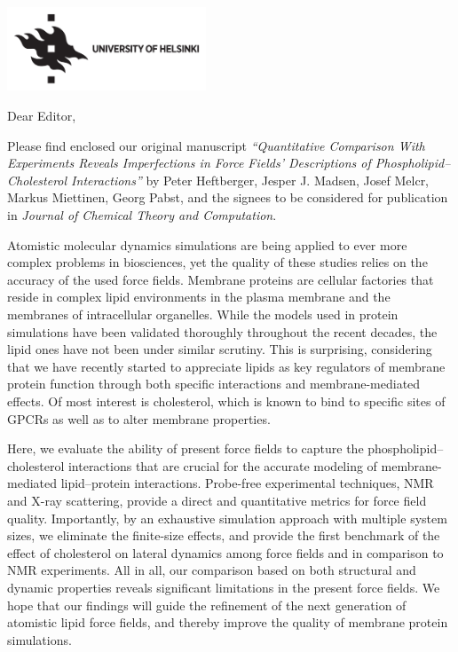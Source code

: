 \documentclass[10pt]{article}
\begin{document}
\begin{flushright}
\includegraphics[height=2.5cm]{CoverLetter/logo_uh.pdf}
\end{flushright}

\bigskip
\bigskip
\bigskip
Dear Editor,
\bigskip

Please find enclosed our original manuscript \emph{``Quantitative Comparison With Experiments Reveals Imperfections in Force Fields' Descriptions of Phospholipid--Cholesterol Interactions''} by Peter Heftberger, Jesper J. Madsen, Josef Melcr, Markus Miettinen, Georg Pabst, and the signees to be considered for publication in \emph{Journal of Chemical Theory and Computation}.

Atomistic molecular dynamics simulations are being applied to ever more complex problems in biosciences, yet the quality of these studies relies on the accuracy of the used force fields. Membrane proteins are cellular factories that reside in complex lipid environments in the plasma membrane and the membranes of intracellular organelles. While the models used in protein simulations have been validated thoroughly throughout the recent decades, the lipid ones have not been under similar scrutiny. This is surprising, considering that we have recently started to appreciate lipids as key regulators of membrane protein function through both specific interactions and membrane-mediated effects. Of most interest is cholesterol, which is known to bind to specific sites of GPCRs as well as to alter membrane properties.

Here, we evaluate the ability of present force fields to capture the phospholipid--cholesterol interactions that are crucial for the accurate modeling of membrane-mediated lipid--protein interactions. Probe-free experimental techniques, NMR and X-ray scattering, provide a direct and quantitative metrics for force field quality. Importantly, by an exhaustive simulation approach with multiple system sizes, we eliminate the finite-size effects, and provide the first benchmark of the effect of cholesterol on lateral dynamics among force fields and in comparison to NMR experiments. All in all, our comparison based on both structural and dynamic properties reveals significant limitations in the present force fields. We hope that our findings will guide the refinement of the next generation of atomistic lipid force fields, and thereby improve the quality of membrane protein simulations.
\end{document}
